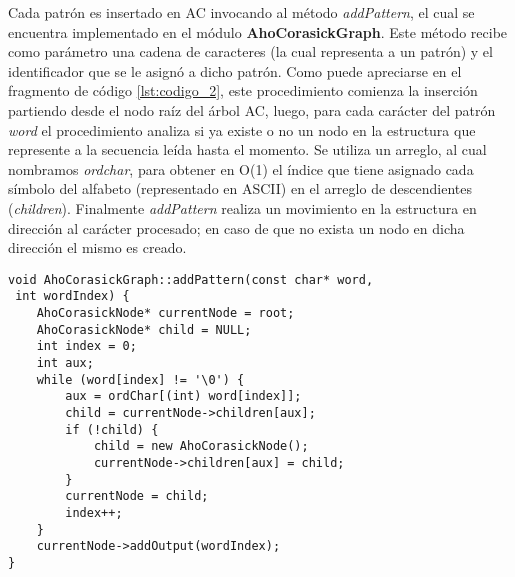 {Cada patrón es insertado en AC invocando al método {\it addPattern}, el cual se encuentra implementado en el módulo {\bf AhoCorasickGraph}. Este método recibe como parámetro una cadena de caracteres (la cual representa a un patrón) y el identificador que se le asignó a dicho patrón. Como puede apreciarse en el fragmento de código {\ref{lst:codigo_2}}, este procedimiento comienza la inserción partiendo desde el nodo raíz del árbol AC, luego, para cada carácter del patrón {\it word} el procedimiento analiza si ya existe o no un nodo en la estructura que represente a la secuencia leída hasta el momento. Se utiliza un arreglo, al cual nombramos \emph{ordchar}, para obtener en O(1) el índice que tiene asignado cada símbolo del alfabeto (representado en ASCII) en el arreglo de descendientes ({\it children}). Finalmente {\it addPattern} realiza un movimiento en la estructura en dirección al carácter procesado; en caso de que no exista un nodo en dicha dirección el mismo es creado.

\begin{lstlisting}[caption=Representación de los nodos en AC, label={lst:codigo_2}]
void AhoCorasickGraph::addPattern(const char* word,
 int wordIndex) {
	AhoCorasickNode* currentNode = root;
	AhoCorasickNode* child = NULL;
	int index = 0;
	int aux;
	while (word[index] != '\0') {
        aux = ordChar[(int) word[index]];
		child = currentNode->children[aux];
		if (!child) {
			child = new AhoCorasickNode();
			currentNode->children[aux] = child;
		}
		currentNode = child;
		index++;
	}
	currentNode->addOutput(wordIndex);
}
\end{lstlisting}

}
